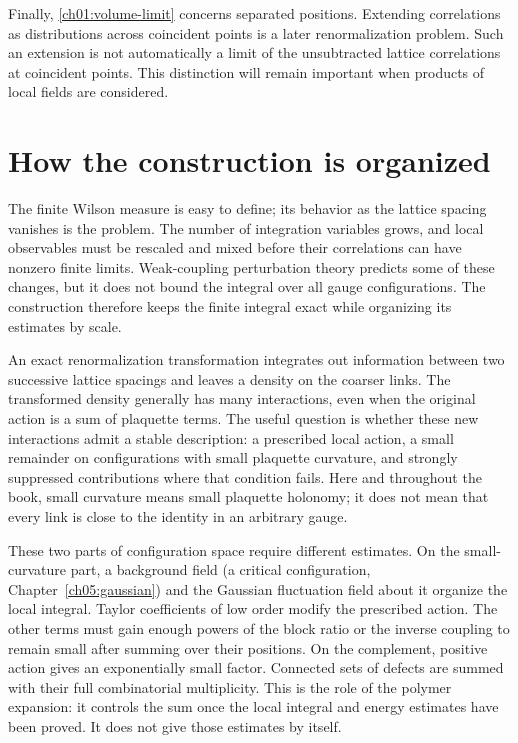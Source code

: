 Finally, \eqref{ch01:volume-limit} concerns separated positions. Extending
correlations as distributions across coincident points is a later
renormalization problem. Such an extension is not automatically a limit
of the unsubtracted lattice correlations at coincident points. This distinction
will remain important when products of local fields are considered.

\section{How the construction is organized}
\label{ch01:strategy}

The finite Wilson measure is easy to define; its behavior as the lattice
spacing vanishes is the problem. The number of integration variables grows,
and local observables must be rescaled and mixed before their correlations
can have nonzero finite limits. Weak-coupling perturbation theory predicts
some of these changes, but it does not bound the integral over all gauge
configurations. The construction therefore keeps the finite integral exact
while organizing its estimates by scale.

An exact renormalization transformation integrates out information between two
successive lattice spacings and leaves a density on the coarser links.
The transformed density generally has many interactions, even when the
original action is a sum of plaquette terms. The useful question is whether
these new interactions admit a stable description: a prescribed local
action, a small remainder on configurations with small plaquette curvature,
and strongly suppressed contributions where that condition fails.
Here and throughout the book, small curvature means small plaquette
holonomy; it does not mean that every link is close to the identity in an
arbitrary gauge.

These two parts of configuration space require different estimates.
On the small-curvature part, a background field (a critical configuration, Chapter~\ref{ch05:gaussian}) and the Gaussian
fluctuation field about it organize the local integral. Taylor coefficients of low order
modify the prescribed action. The other terms must gain enough powers of
the block ratio or the inverse coupling to remain small after summing over
their positions. On the complement, positive action gives an exponentially
small factor. Connected sets of defects are summed with their full combinatorial
multiplicity. This is the role of the polymer expansion: it controls the
sum once the local integral and energy estimates have been proved.
It does not give those estimates by itself.


